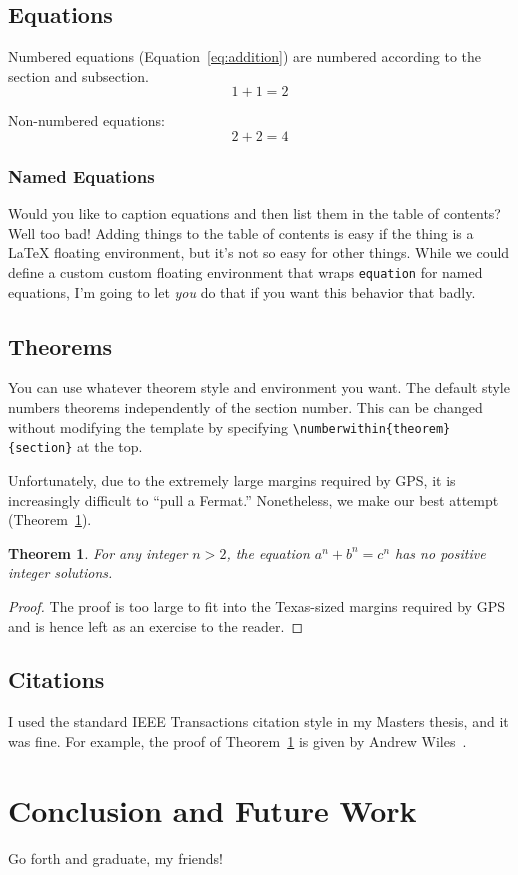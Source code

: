 \documentclass[12pt]{ruthesis}
\newtheorem{theorem}{Theorem}
\begin{document}
\section{Equations}

Numbered equations (Equation~\ref{eq:addition}) are numbered according to the section and subsection.
\begin{equation}
\label{eq:addition}
    1 + 1 = 2
\end{equation}

Non-numbered equations: 
\begin{equation*}
    2 + 2 = 4
\end{equation*}


\subsection{Named Equations}
Would you like to caption equations and then list them in the table of contents? Well too bad! Adding things to the table of contents is easy if the thing is a LaTeX floating environment, but it's not so easy for other things. While we could define a custom custom floating environment that wraps \verb_equation_ for named equations, I'm going to let \textit{you} do that if you want this behavior that badly.

\section{Theorems}

You can use whatever theorem style and environment you want. The default style numbers theorems independently of the section number. This can be changed without modifying the template by specifying \verb_\numberwithin{theorem}{section}_ at the top.

Unfortunately, due to the extremely large margins required by GPS, it is increasingly difficult to ``pull a Fermat.'' Nonetheless, we make our best attempt (Theorem~\ref{thm:fermat}).

\begin{theorem}
\label{thm:fermat}
For any integer $n > 2$, the equation $a^n + b^n = c^n$ has no positive integer solutions.
\end{theorem}
\begin{proof}
The proof is too large to fit into the Texas-sized margins required by GPS and is hence left as an exercise to the reader.
\end{proof}

\section{Citations}
I used the standard IEEE Transactions citation style in my Masters thesis, and it was fine. For example, the proof of Theorem~\ref{thm:fermat} is given by Andrew Wiles~\cite{wiles1995modular}.

\chapter{Conclusion and Future Work}

Go forth and graduate, my friends!



\end{document}
